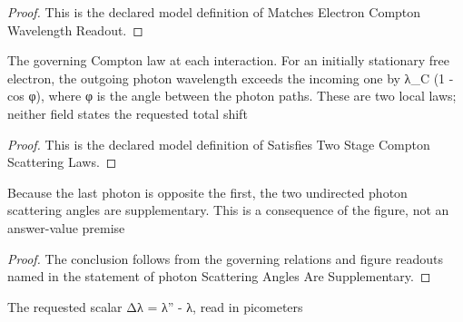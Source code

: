\begin{proof}
  This is the declared model definition of Matches Electron Compton Wavelength Readout.
\end{proof}
\begin{definition}
  \label{def:physics:phyx-mini-0530:phyxminiproblems-problemphyxmini0530-satisfiestwostagecomptonscatteringlaws}
  The governing Compton law at each interaction. For an initially stationary free electron, the outgoing photon wavelength exceeds the incoming one by λ\_C (1 - cos φ), where φ is the angle between the photon paths. These are two local laws; neither field states the requested total shift
\end{definition}
\begin{proof}
  This is the declared model definition of Satisfies Two Stage Compton Scattering Laws.
\end{proof}
\begin{lemma}
  \label{lem:physics:phyx-mini-0530:phyxminiproblems-problemphyxmini0530-photonscatteringanglesaresupplementary}
  Because the last photon is opposite the first, the two undirected photon scattering angles are supplementary. This is a consequence of the figure, not an answer-value premise
\end{lemma}
\begin{proof}
  The conclusion follows from the governing relations and figure readouts named in the statement of photon Scattering Angles Are Supplementary.
\end{proof}
\begin{definition}
  \label{def:physics:phyx-mini-0530:phyxminiproblems-problemphyxmini0530-wavelengthshiftinpicometers}
  The requested scalar Δλ = λ'' - λ, read in picometers
\end{definition}
